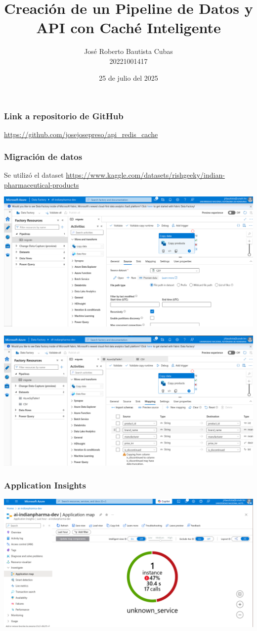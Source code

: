 \documentclass{beamer}
\title{Creaci\'on de un Pipeline de Datos y API con Cach\'e Inteligente}
\author{Jos\'e Roberto Bautista Cubas \\ 20221001417}
\institute{UNAH}
\date{25 de julio del 2025}
\begin{document}
\frame{\titlepage}

\begin{frame}
\frametitle{Link a repositorio de GitHub}
	\url{https://github.com/josejosepreso/api_redis_cache}
\end{frame}

\begin{frame}
\frametitle{Migraci\'on de datos}
	Se utiliz\'o el dataset \url{https://www.kaggle.com/datasets/rishgeeky/indian-pharmaceutical-products}

	\vspace{1em}

	\includegraphics[width=\textwidth]{01.png}
\end{frame}

\begin{frame}
	\includegraphics[width=\textwidth]{02.png}
\end{frame}

\begin{frame}
	\frametitle{Application Insights}
	\includegraphics[width=\textwidth]{3.5.png}
\end{frame}
\end{document}
